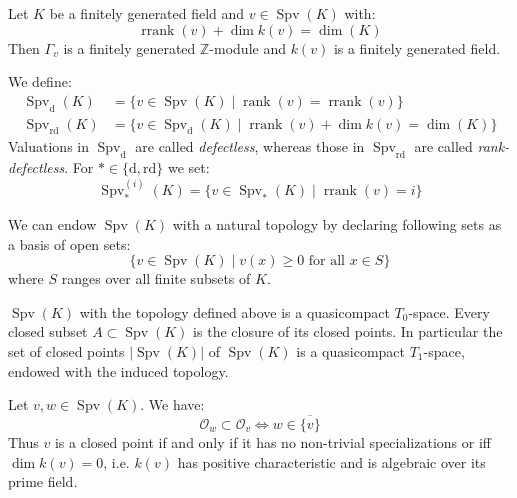 \begin{lemma}
Let $K$ be a finitely generated field and $v\in\operatorname{Spv}(K)$ with:
\[\operatorname{rrank}(v)+\dim k(v)= \dim(K) \]
Then $\Gamma_v$ is a finitely generated $\mathbb{Z}$-module and $k(v)$ is a finitely generated field.
\end{lemma}

\begin{definition}
We define:
\begin{align*}
\operatorname{Spv}_\text{d}(K) &= \{v\in\operatorname{Spv}(K)\mid\operatorname{rank}(v)=\operatorname{rrank}(v) \} \\
\operatorname{Spv}_\text{rd}(K) &= \{v\in\operatorname{Spv}_\text{d}(K)\mid \operatorname{rrank}(v)+\dim k(v)=\dim(K) \}
\end{align*}
Valuations in $\operatorname{Spv}_\text{d}$ are called \textit{defectless}, whereas those in $\operatorname{Spv}_\text{rd}$ are called \textit{rank-defectless}. For $\ast\in\{\text{d},\text{rd}\}$ we set:
\[\operatorname{Spv}_\ast^{(i)}(K)=\{v\in\operatorname{Spv}_\ast(K)\mid \operatorname{rrank}(v)=i \} \]
\end{definition}

\begin{definition}
We can endow $\operatorname{Spv}(K)$ with a natural topology by declaring following sets as a basis of open sets:
\[\{v\in\operatorname{Spv}(K)\mid v(x)\geq 0\text{ for all }x\in S\} \]
where $S$ ranges over all finite subsets of $K$. 
\end{definition}

\begin{lemma}
$\operatorname{Spv}(K)$ with the topology defined above is a quasicompact $T_0$-space. Every closed subset $A\subset\operatorname{Spv}(K)$ is the closure of its closed points. In particular the set of closed points $|\operatorname{Spv}(K)|$ of $\operatorname{Spv}(K)$ is a quasicompact $T_1$-space, endowed with the induced topology.
\end{lemma}

\begin{lemma}\label{2.2-prepre}
Let $v,w\in\operatorname{Spv}(K)$. We have:
\[\mathcal{O}_w\subset\mathcal{O}_v \iff w\in\overline{\{v\}} \]
Thus $v$ is a closed point if and only if it has no non-trivial specializations or iff $\dim k(v)=0$, i.e. $k(v)$ has positive characteristic and is algebraic over its prime field.
\end{lemma}

